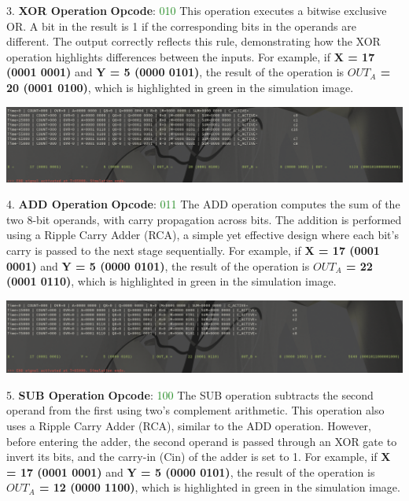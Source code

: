 \documentclass[12pt, letterpaper]{article}
\begin{document}
3.     \textbf{XOR Operation}
    \textbf{Opcode}: \textcolor{ForestGreen}{010}
    This operation executes a bitwise exclusive OR. A bit in the result is 1 if the corresponding bits in the operands are different. The output correctly reflects this rule, demonstrating how the XOR operation highlights differences between the inputs.
    For example, if \textbf{X = 17 (0001 0001)} and \textbf{Y = 5 (0000 0101)}, the result of the operation is \textbf{$OUT_A$ = 20 (0001 0100)}, which is highlighted in green in the simulation image.

\begin{center}
\includegraphics[scale=0.3]{Documentation/XOR}
\end{center}

4. \textbf{ADD Operation}
\textbf{Opcode}: \textcolor{ForestGreen}{011}
The ADD operation computes the sum of the two 8-bit operands, with carry propagation across bits. The addition is performed using a Ripple Carry Adder (RCA), a simple yet effective design where each bit's carry is passed to the next stage sequentially.
For example, if \textbf{X = 17 (0001 0001)} and \textbf{Y = 5 (0000 0101)}, the result of the operation is \textbf{$OUT_A$ = 22 (0001 0110)}, which is highlighted in green in the simulation image.

\begin{center}
\includegraphics[scale=0.3]{Documentation/ADD}
\end{center}

5.     \textbf{SUB Operation}
    \textbf{Opcode}: \textcolor{ForestGreen}{100}
    The SUB operation subtracts the second operand from the first using two’s complement arithmetic. This operation also uses a Ripple Carry Adder (RCA), similar to the ADD operation. However, before entering the adder, the second operand is passed through an XOR gate to invert its bits, and the carry-in (Cin) of the adder is set to 1.
    For example, if \textbf{X = 17 (0001 0001)} and \textbf{Y = 5 (0000 0101)}, the result of the operation is \textbf{$OUT_A$ = 12 (0000 1100)}, which is highlighted in green in the simulation image.
\end{document}
